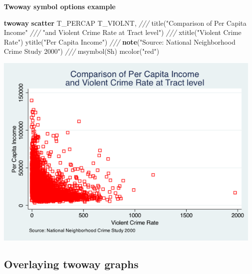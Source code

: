\documentclass[
]{book}
\newenvironment{Shaded}{\begin{snugshade}}{\end{snugshade}}
\newcommand{\BaseNTok}[1]{\textcolor[rgb]{0.00,0.00,0.81}{#1}}
\newcommand{\CommentTok}[1]{\textcolor[rgb]{0.56,0.35,0.01}{\textit{#1}}}
\newcommand{\KeywordTok}[1]{\textcolor[rgb]{0.13,0.29,0.53}{\textbf{#1}}}
\newcommand{\NormalTok}[1]{#1}
\newcommand{\StringTok}[1]{\textcolor[rgb]{0.31,0.60,0.02}{#1}}
\begin{document}
\textbf{Twoway symbol options example}

\begin{Shaded}
\begin{Highlighting}[]
\KeywordTok{twoway} \KeywordTok{scatter}\NormalTok{ T\_PERCAP T\_VIOLNT, }\CommentTok{///}
    \BaseNTok{title}\NormalTok{(}\StringTok{"Comparison of Per Capita Income"} \CommentTok{///}
          \StringTok{"and Violent Crime Rate at Tract level"}\NormalTok{) }\CommentTok{///}
    \BaseNTok{xtitle}\NormalTok{(}\StringTok{"Violent Crime Rate"}\NormalTok{) }\BaseNTok{ytitle}\NormalTok{(}\StringTok{"Per Capita Income"}\NormalTok{) }\CommentTok{///}
    \KeywordTok{note}\NormalTok{(}\StringTok{"Source: National Neighborhood Crime Study 2000"}\NormalTok{) }\CommentTok{///}
    \BaseNTok{msymbol}\NormalTok{(Sh) mcolor(}\StringTok{"red"}\NormalTok{)}
\end{Highlighting}
\end{Shaded}

\includegraphics{Stata/StataGraph/images/msymbol_mcolor.png}

\hypertarget{overlaying-twoway-graphs}{%
\subsection{Overlaying twoway graphs}\label{overlaying-twoway-graphs}}
\end{document}
